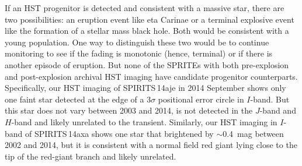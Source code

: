 \documentclass[twocolumn,times]{aastex6}
\begin{document}
If an HST progenitor is detected and consistent with a massive star, there are two possibilities: an eruption event like eta Carinae
or a terminal explosive event like the formation of a stellar mass black hole. Both would be consistent with a young population. One way to distinguish 
these two would be to continue monitoring to see if the fading is monotonic (hence, terminal) or if there is another episode of eruption.
But none of the SPRITEs with both pre-explosion and post-explosion archival HST imaging have candidate progenitor counterparts.  
Specifically, our HST imaging of SPIRITS\,14aje in 2014 September shows only one faint star detected at the edge of a 3$\sigma$
positional error circle in $I$-band. But this star does not vary between 2003 and 2014, is not detected in the $J$-band and $H$-band
and likely unrelated to the transient. Similarly, our HST imaging in $I$-band of SPIRITS\,14axa shows one star that brightened by $\sim$0.4~mag 
between 2002 and 2014, but it is consistent with a normal field red giant lying close to the tip of the red-giant branch and likely unrelated.
%
\end{document}
